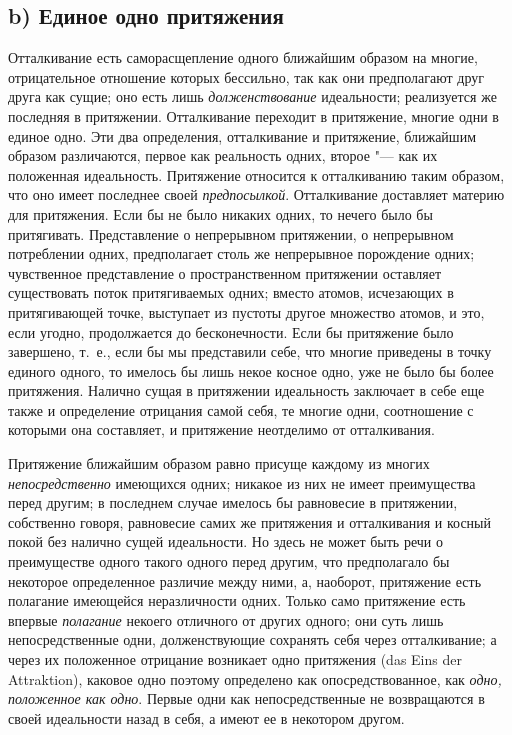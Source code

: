 \subsection[b) Единое одно притяжения]{b) Единое одно притяжения}

Отталкивание есть саморасщепление одного ближайшим образом на многие,
отрицательное отношение которых бессильно, так как они предполагают друг
друга как сущие; оно есть лишь {\em долженствование}
идеальности; реализуется же последняя в притяжении. Отталкивание переходит
в притяжение, многие одни в единое одно. Эти два определения, отталкивание
и притяжение, ближайшим образом различаются, первое как реальность одних,
второе "--- как их положенная идеальность. Притяжение относится к отталкиванию
таким образом, что оно имеет последнее своей
{\em предпосылкой}. Отталкивание доставляет материю для
притяжения. Если бы не было никаких одних, то нечего было бы притягивать.
Представление о непрерывном притяжении, о непрерывном потреблении одних,
предполагает столь же непрерывное порождение одних; чувственное
представление о пространственном притяжении оставляет существовать поток
притягиваемых одних; вместо атомов, исчезающих в притягивающей точке,
выступает из пустоты другое множество атомов, и это, если угодно,
продолжается до бесконечности. Если бы притяжение было завершено, т.~е.,
если бы мы представили себе, что многие приведены в точку единого одного,
то имелось бы лишь некое косное одно, уже не было бы более притяжения.
Налично сущая в притяжении идеальность заключает в себе еще также и
определение отрицания самой себя, те многие одни, соотношение с которыми
она составляет, и притяжение неотделимо от отталкивания.

Притяжение ближайшим образом равно присуще каждому из многих
{\em непосредственно} имеющихся одних; никакое из них
не имеет преимущества перед другим; в последнем случае имелось бы
равновесие в притяжении, собственно говоря, равновесие самих же притяжения
и отталкивания и косный покой без налично сущей идеальности. Но здесь не
может быть речи о преимуществе одного такого одного перед другим, что
предполагало бы некоторое определенное различие между ними, а, наоборот,
притяжение есть полагание имеющейся неразличности одних. Только само
притяжение есть впервые {\em полагание} некоего
отличного от других одного; они суть лишь непосредственные одни,
долженствующие сохранять себя через отталкивание; а через их положенное
отрицание возникает одно притяжения (das Eins der Attraktion), каковое одно
поэтому определено как опосредствованное, как
{\em одно, положенное как одно}. Первые одни как
непосредственные не возвращаются в своей идеальности назад в себя, а имеют
ее в некотором другом.

